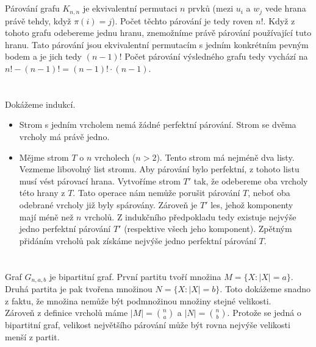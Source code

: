 \documentclass{scrartcl}
\begin{document}
    \section{}
        Párování grafu $K_{n,n}$ je ekvivalentní permutaci $n$ prvků (mezi $u_i$ a $w_j$ vede hrana právě tehdy, když $\pi(i) = j$). Počet těchto párování je tedy roven $n!$. Když z tohoto grafu odebereme jednu hranu, znemožníme právě párování používající tuto hranu. Tato párování jsou ekvivalentní permutacím s jedním konkrétním pevným bodem a je jich tedy $(n-1)!$ Počet párování výsledného grafu tedy vychází na $n! - (n-1)! = (n-1)! \cdot (n-1)$.
    
    \section{}
        Dokážeme indukcí. \\
        \begin{itemize}
            \item Strom s jedním vrcholem nemá žádné perfektní párování. Strom se dvěma vrcholy má právě jedno.
            \item Mějme strom $T$ o $n$ vrcholech ($n > 2$). Tento strom má nejméně dva listy. Vezmeme libovolný list stromu. Aby párování bylo perfektní, z tohoto listu musí vést párovací hrana. Vytvoříme strom $T'$ tak, že odebereme oba vrcholy této hrany z $T$. Tato operace nám nemůže porušit párování $T$, neboť oba odebrané vrcholy již byly spárovány. Zároveň je $T'$ les, jehož komponenty mají méně než $n$ vrcholů. Z indukčního předpokladu tedy existuje nejvýše jedno perfektní párování $T'$ (respektive všech jeho komponent). Zpětným přidáním vrcholů pak získáme nejvýše jedno perfektní párování $T$.
        \end{itemize}

    \section{}
        Graf $G_{n,a,b}$ je bipartitní graf. První partitu tvoří množina $M = \{ X :\vert X \vert = a\}$. Druhá partita je pak tvořena množinou $N = \{ X : \vert X \vert = b \}$. Toto dokážeme snadno z faktu, že množina nemůže být podmnožinou množiny stejné velikosti.\\

        Zároveň z definice vrcholů máme $\vert M \vert = \binom{n}{a}$ a $\vert N \vert = \binom{n}{b}$. Protože se jedná o bipartitní graf, velikost největšího párování může být rovna nejvýše velikosti menší z partit.\\
\end{document}
